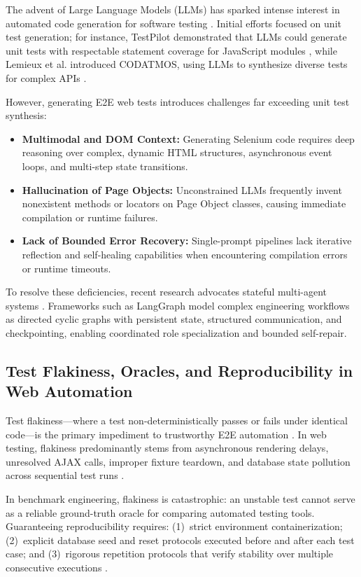 \documentclass[pdflatex,sn-mathphys-num]{sn-jnl}
\begin{document}
The advent of Large Language Models (LLMs) has sparked intense interest in automated code generation for software testing \cite{wang2024software}. Initial efforts focused on unit test generation; for instance, TestPilot demonstrated that LLMs could generate unit tests with respectable statement coverage for JavaScript modules \cite{schafer2023testpilot}, while Lemieux et al. introduced CODATMOS, using LLMs to synthesize diverse tests for complex APIs \cite{lemieux2023codatmos}.

However, generating E2E web tests introduces challenges far exceeding unit test synthesis:
\begin{itemize}
    \item \textbf{Multimodal and DOM Context:} Generating Selenium code requires deep reasoning over complex, dynamic HTML structures, asynchronous event loops, and multi-step state transitions.
    \item \textbf{Hallucination of Page Objects:} Unconstrained LLMs frequently invent nonexistent methods or locators on Page Object classes, causing immediate compilation or runtime failures.
    \item \textbf{Lack of Bounded Error Recovery:} Single-prompt pipelines lack iterative reflection and self-healing capabilities when encountering compilation errors or runtime timeouts.
\end{itemize}
To resolve these deficiencies, recent research advocates stateful multi-agent systems \cite{wang2024software}. Frameworks such as LangGraph \cite{langgraph2024} model complex engineering workflows as directed cyclic graphs with persistent state, structured communication, and checkpointing, enabling coordinated role specialization and bounded self-repair.

\subsection{Test Flakiness, Oracles, and Reproducibility in Web Automation}

Test flakiness---where a test non-deterministically passes or fails under identical code---is the primary impediment to trustworthy E2E automation \cite{luo2014empirical}. In web testing, flakiness predominantly stems from asynchronous rendering delays, unresolved AJAX calls, improper fixture teardown, and database state pollution across sequential test runs \cite{yandrapally2020robust}.

In benchmark engineering, flakiness is catastrophic: an unstable test cannot serve as a reliable ground-truth oracle for comparing automated testing tools. Guaranteeing reproducibility requires: (1)~strict environment containerization; (2)~explicit database seed and reset protocols executed before and after each test case; and (3)~rigorous repetition protocols that verify stability over multiple consecutive executions \cite{olianas2026bewt}.
\end{document}
